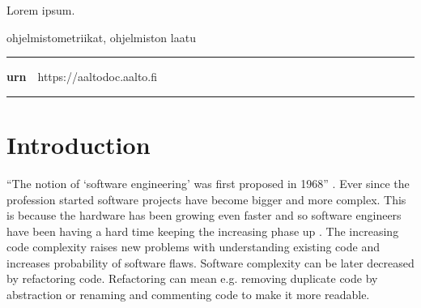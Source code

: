 \begin{spacing}{1.05}

\vspace{.8mm}

{\small
  Lorem ipsum.
}

\vfill

\end{spacing}
\begin{spacing}{.88}
{\parindent0pt %

\parbox[t]{121.6mm}{\raggedright\small ohjelmistometriikat, ohjelmiston laatu}

\vspace{.5mm}\rule{\textwidth}{.75pt}

{\fontsize{10.5pt}{10.5pt}\bfseries\sffamily\lsstyle urn}~~{\small https://aaltodoc.aalto.fi}

\vspace{-2.4mm}\rule{\textwidth}{.75pt}

} %
\end{spacing}

\restoregeometry  %




\newpage

\tableofcontents


\newpage



\chapter{Introduction}

“The notion of ‘software engineering’ was first proposed in 1968” \cite{sommerville2011software}. Ever since the profession started software projects have become bigger and more complex. This is because the hardware has been growing even faster and so software engineers have been having a hard time keeping the increasing phase up \cite{brooks1987no}. The increasing code complexity raises new problems with understanding existing code and increases probability of software flaws. Software complexity can be later decreased by refactoring code. Refactoring can mean e.g. removing duplicate code by abstraction or renaming and commenting code to make it more readable.

